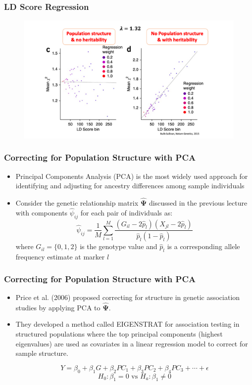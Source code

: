 \documentclass{beamer}
\begin{document}
\begin{frame}
	\frametitle{\bf LD Score Regression}
	\vspace{-1em}
\begin{figure}
	\includegraphics[scale=.35]{Figures/ldsc}
\end{figure}

\end{frame}



\begin{frame}
\frametitle{\bf Correcting for  Population Structure with PCA}
\begin{itemize}
\item Principal Components Analysis (PCA) is the most widely used approach for identifying and adjusting for ancestry differences among sample individuals
\item Consider the genetic relationship matrix  $\mathbf{\hat{\Psi}}$ discussed in the previous lecture with components $\hat{\psi}_{ij}$ for each pair of individuals as:
\[ \hat{\psi}_{ij}=\frac{1}{M}\sum_{l=1}^{M}\frac{(G_{il}-2\hat{p}_l)(X_{jl}-2\hat{p}_l)}{\hat{p}_l(1-\hat{p}_l)} \]
where $G_{il}=\{0,1,2\} $ is the genotype value and $\hat{p}_l$ is a corresponding allele frequency estimate at marker $l$
\end{itemize}
\end{frame}

\begin{frame}
\frametitle{\bf Correcting for  Population Structure with PCA}
\begin{itemize}
\item Price et al. (2006) proposed correcting for structure in genetic association studies by applying PCA to $\mathbf{\hat{\Psi}}$.
\item They developed a method called EIGENSTRAT for association testing in structured populations where the top principal components (highest eigenvalues)  are used as covariates in a linear regression model to correct for sample structure.

  \[ Y = \beta _0 + \beta _1G +\beta_2PC_1 +\beta_3PC_2 +\beta_4PC_3+ \cdots + \epsilon \]
  \[H_0: \beta _1=0 \text{ vs } H_a: \beta _1\ne0 \]
\end{itemize}
\end{frame}
\end{document}
